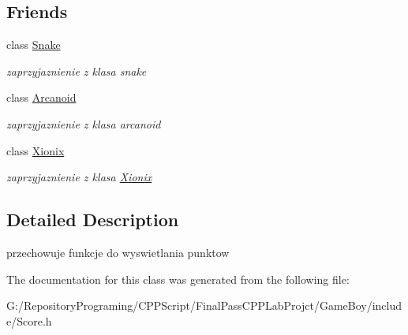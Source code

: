\subsection*{Friends}
\begin{DoxyCompactItemize}
\item 
\mbox{\label{class_score_a0d1454792bff9aa4565c84db0a9e32bc}} 
class \mbox{\hyperlink{class_score_a0d1454792bff9aa4565c84db0a9e32bc}{Snake}}
\begin{DoxyCompactList}\small\item\em zaprzyjaznienie z klasa snake \end{DoxyCompactList}\item 
\mbox{\label{class_score_a96d0db057cebfb3fdbfff6370f755e0f}} 
class \mbox{\hyperlink{class_score_a96d0db057cebfb3fdbfff6370f755e0f}{Arcanoid}}
\begin{DoxyCompactList}\small\item\em zaprzyjaznienie z klasa arcanoid \end{DoxyCompactList}\item 
\mbox{\label{class_score_afa0515d3dd9e19796a5a6162d23717fd}} 
class \mbox{\hyperlink{class_score_afa0515d3dd9e19796a5a6162d23717fd}{Xionix}}
\begin{DoxyCompactList}\small\item\em zaprzyjaznienie z klasa \mbox{\hyperlink{class_xionix}{Xionix}} \end{DoxyCompactList}\end{DoxyCompactItemize}


\subsection{Detailed Description}
przechowuje funkcje do wyswietlania punktow 

The documentation for this class was generated from the following file\+:\begin{DoxyCompactItemize}
\item 
G\+:/\+Repository\+Programing/\+C\+P\+P\+Script/\+Final\+Pass\+C\+P\+P\+Lab\+Projct/\+Game\+Boy/include/Score.\+h\end{DoxyCompactItemize}
